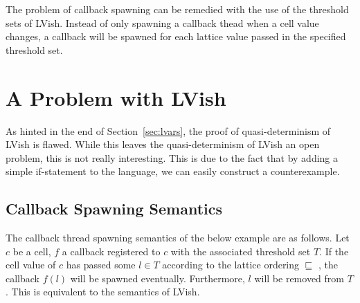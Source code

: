 The problem of callback spawning can be remedied with the use of the threshold
sets of LVish. Instead of only spawning a callback thead when a cell value
changes, a callback will be spawned for each lattice value passed in the
specified threshold set.



\section{A Problem with LVish}%
\label{sec:a_problem_of_lvish}

As hinted in the end of Section~\ref{sec:lvars}, the proof of quasi-determinism
of LVish is flawed. While this leaves the quasi-determinism of LVish an open
problem, this is not really interesting. This is due to the fact that by adding a
simple if-statement to the language, we can easily construct a counterexample.

\subsection{Callback Spawning Semantics}%
\label{sub:callback_spawning_semantics_lvish}

The callback thread spawning semantics of the below example are as follows. Let
$c$ be a cell, $f$ a callback registered to $c$ with the associated threshold
set $T$. If the cell value of $c$ has passed some $l \in T$ according to the lattice
ordering $\sqsubseteq$ , the callback $f(l)$ will be spawned eventually.
Furthermore, $l$ will be removed from $T$. This is equivalent to the semantics
of LVish.


